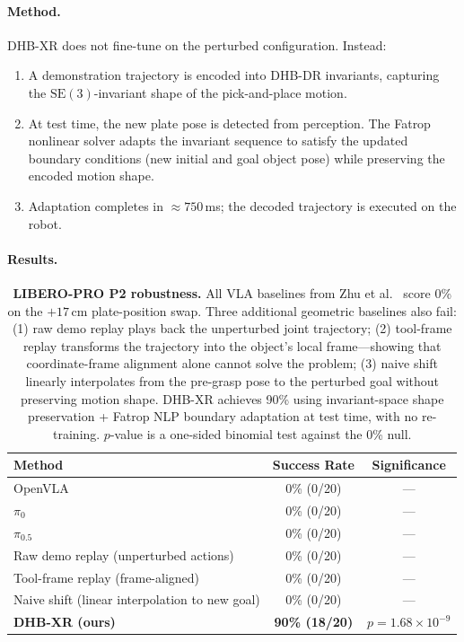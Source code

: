 \documentclass[11pt]{article}
\begin{document}
\paragraph{Method.}
DHB-XR does not fine-tune on the perturbed configuration. Instead:
\begin{enumerate}
  \item A demonstration trajectory is encoded into DHB-DR invariants, capturing the $\mathrm{SE}(3)$-invariant shape of the pick-and-place motion.
  \item At test time, the new plate pose is detected from perception. The Fatrop nonlinear solver \cite{vanroye2023fatrop} adapts the invariant sequence to satisfy the updated boundary conditions (new initial and goal object pose) while preserving the encoded motion shape.
  \item Adaptation completes in ${\approx}750$\,ms; the decoded trajectory is executed on the robot.
\end{enumerate}

\paragraph{Results.}
\begin{table}[H]
  \centering
  \small
  \begin{tabular}{@{}lcc@{}}
    \toprule
    \textbf{Method} & \textbf{Success Rate} & \textbf{Significance} \\
    \midrule
    OpenVLA \cite{zhu2025liberopro} & 0\% (0/20) & --- \\
    $\pi_0$ \cite{zhu2025liberopro} & 0\% (0/20) & --- \\
    $\pi_{0.5}$ \cite{zhu2025liberopro} & 0\% (0/20) & --- \\
    Raw demo replay (unperturbed actions) & 0\% (0/20) & --- \\
    Tool-frame replay (frame-aligned) & 0\% (0/20) & --- \\
    Naive shift (linear interpolation to new goal) & 0\% (0/20) & --- \\
    \midrule
    \textbf{DHB-XR (ours)} & \textbf{90\% (18/20)} & $p = 1.68\times10^{-9}$ \\
    \bottomrule
  \end{tabular}
  \caption{\textbf{LIBERO-PRO P2 robustness.} All VLA baselines from Zhu et al.\ \cite{zhu2025liberopro} score 0\% on the $+17$\,cm plate-position swap. Three additional geometric baselines also fail: (1) raw demo replay plays back the unperturbed joint trajectory; (2) tool-frame replay transforms the trajectory into the object's local frame---showing that coordinate-frame alignment alone cannot solve the problem; (3) naive shift linearly interpolates from the pre-grasp pose to the perturbed goal without preserving motion shape. DHB-XR achieves 90\% using invariant-space shape preservation + Fatrop NLP boundary adaptation at test time, with no re-training. $p$-value is a one-sided binomial test against the 0\% null.}
  \label{tab:liberopro_p2}
\end{table}
\end{document}
